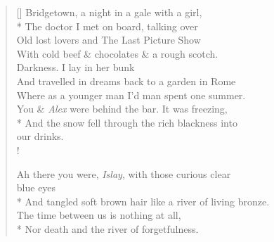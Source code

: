 \begin{verse}[\versewidth]
{\sc Bridgetown}, a night in a gale with a girl,\\*
The doctor I met on board, talking over\\
Old lost lovers and {\hoskeroe The Last Picture Show}\\
With cold beef \& chocolates \& a rough scotch.\\
Darkness. I lay in her bunk\\
And travelled in dreams back to a garden in {\sc Rome}\\
Where as a younger man I'd man spent one summer.\\
You \& \emph{Alex} were behind the bar. It was freezing,\\*
And the snow fell through the rich blackness into\\ \vin \vin our drinks.\\!

Ah there you were, \emph{Islay}, with those curious clear\\ \vin \vin blue eyes\\*
And tangled soft brown hair like a river of living bronze.\\
The time between us is nothing at all,\\*
Nor death and the river of forgetfulness.
\end{verse}
